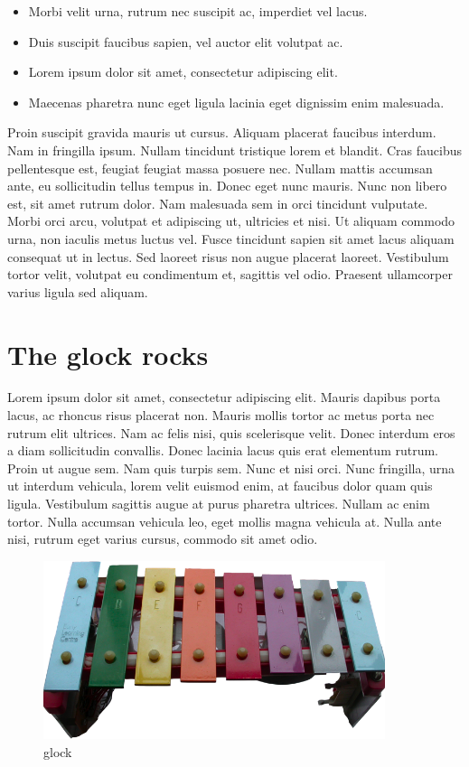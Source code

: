 \documentclass[11pt,oneside,openany]{book}
\begin{document}
\begin{itemize}
\item Morbi velit urna, rutrum nec suscipit ac, imperdiet vel lacus.
\item Duis suscipit faucibus sapien, vel auctor elit volutpat ac.
\item Lorem ipsum dolor sit amet, consectetur adipiscing elit.
\item Maecenas pharetra nunc eget ligula lacinia eget dignissim enim malesuada.
\end{itemize}

Proin suscipit gravida mauris ut cursus. Aliquam placerat faucibus interdum. Nam in fringilla ipsum. Nullam tincidunt tristique lorem et blandit. Cras faucibus pellentesque est, feugiat feugiat massa posuere nec. Nullam mattis accumsan ante, eu sollicitudin tellus tempus in. Donec eget nunc mauris. Nunc non libero est, sit amet rutrum dolor. Nam malesuada sem in orci tincidunt vulputate. Morbi orci arcu, volutpat et adipiscing ut, ultricies et nisi. Ut aliquam commodo urna, non iaculis metus luctus vel. Fusce tincidunt sapien sit amet lacus aliquam consequat ut in lectus. Sed laoreet risus non augue placerat laoreet. Vestibulum tortor velit, volutpat eu condimentum et, sagittis vel odio. Praesent ullamcorper varius ligula sed aliquam.

\chapter{The glock rocks}\hypertarget{the-glock-rocks}{}\label{the-glock-rocks}

Lorem ipsum dolor sit amet, consectetur adipiscing elit. Mauris dapibus porta lacus, ac rhoncus risus placerat non. Mauris mollis tortor ac metus porta nec rutrum elit ultrices. Nam ac felis nisi, quis scelerisque velit. Donec interdum eros a diam sollicitudin convallis. Donec lacinia lacus quis erat elementum rutrum. Proin ut augue sem. Nam quis turpis sem. Nunc et nisi orci. Nunc fringilla, urna ut interdum vehicula, lorem velit euismod enim, at faucibus dolor quam quis ligula. Vestibulum sagittis augue at purus pharetra ultrices. Nullam ac enim tortor. Nulla accumsan vehicula leo, eget mollis magna vehicula at. Nulla ante nisi, rutrum eget varius cursus, commodo sit amet odio.

\begin{figure}[htb]
\begin{center}
\includegraphics[width=100mm]{./_media/glock1.png}
\end{center}
\caption{glock}

\end{figure}
\end{document}
